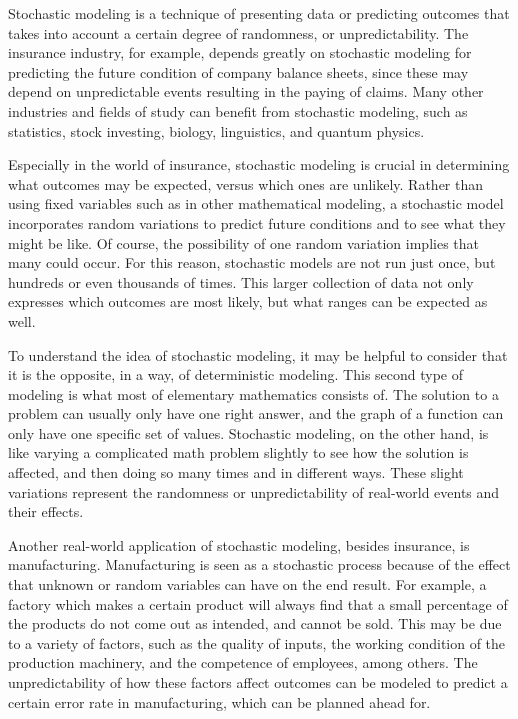 Stochastic modeling is a technique of presenting data or predicting outcomes that takes into account a certain degree of randomness, or unpredictability. The insurance industry, for example, depends greatly on stochastic modeling for predicting the future condition of company balance sheets, since these may depend on unpredictable events resulting in the paying of claims. Many other industries and fields of study can benefit from stochastic modeling, such as statistics, stock investing, biology, linguistics, and quantum physics.

Especially in the world of insurance, stochastic modeling is crucial in determining what outcomes may be expected, versus which ones are unlikely. Rather than using fixed variables such as in other mathematical modeling, a stochastic model incorporates random variations to predict future conditions and to see what they might be like. Of course, the possibility of one random variation implies that many could occur. For this reason, stochastic models are not run just once, but hundreds or even thousands of times. This larger collection of data not only expresses which outcomes are most likely, but what ranges can be expected as well.

To understand the idea of stochastic modeling, it may be helpful to consider that it is the opposite, in a way, of deterministic modeling. This second type of modeling is what most of elementary mathematics consists of. The solution to a problem can usually only have one right answer, and the graph of a function can only have one specific set of values. Stochastic modeling, on the other hand, is like varying a complicated math problem slightly to see how the solution is affected, and then doing so many times and in different ways. These slight variations represent the randomness or unpredictability of real-world events and their effects.

Another real-world application of stochastic modeling, besides insurance, is manufacturing. Manufacturing is seen as a stochastic process because of the effect that unknown or random variables can have on the end result. For example, a factory which makes a certain product will always find that a small percentage of the products do not come out as intended, and cannot be sold. This may be due to a variety of factors, such as the quality of inputs, the working condition of the production machinery, and the competence of employees, among others. The unpredictability of how these factors affect outcomes can be modeled to predict a certain error rate in manufacturing, which can be planned ahead for.
